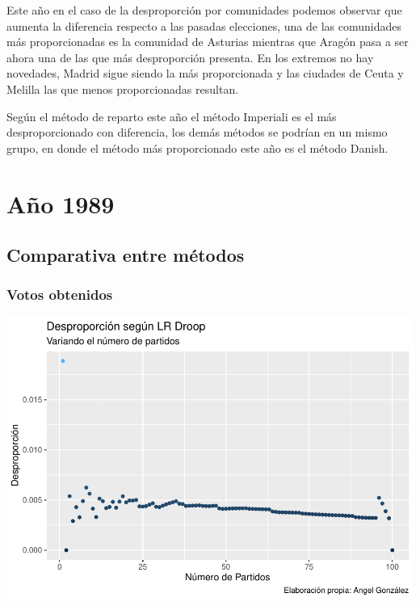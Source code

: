\documentclass[12pt,a4paper,]{book}
\numberwithin{dummy}{section}
\theoremstyle{ocrenumbox}
\theoremstyle{blacknumex}
\theoremstyle{blacknumbox}
\theoremstyle{ocrenum}
\theoremstyle{ocrenum}
\begin{document}
Este año en el caso de la desproporción por comunidades podemos observar
que aumenta la diferencia respecto a las pasadas elecciones, una de las
comunidades más proporcionadas es la comunidad de Asturias mientras que
Aragón pasa a ser ahora una de las que más desproporción presenta. En
los extremos no hay novedades, Madrid sigue siendo la más proporcionada
y las ciudades de Ceuta y Melilla las que menos proporcionadas resultan.

Según el método de reparto este año el método Imperiali es el más
desproporcionado con diferencia, los demás métodos se podrían en un
mismo grupo, en donde el método más proporcionado este año es el método
Danish.

\hypertarget{auxf1o-1989}{%
\section{Año 1989}\label{auxf1o-1989}}

\hypertarget{comparativa-entre-muxe9todos-4}{%
\subsection{Comparativa entre
métodos}\label{comparativa-entre-muxe9todos-4}}

\hypertarget{votos-obtenidos-4}{%
\subsubsection{Votos obtenidos}\label{votos-obtenidos-4}}

\begin{center}\includegraphics[width=0.95\linewidth]{figurasR/unnamed-chunk-47-1} \end{center}
\end{document}
